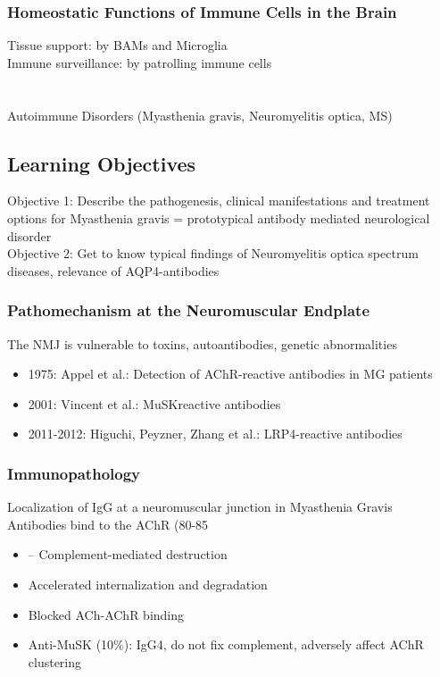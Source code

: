 \begin{itemize}
\begin{itemize}
\subsubsection{Homeostatic Functions of Immune Cells in the Brain}
Tissue support: by BAMs and Microglia
\\Immune surveillance: by patrolling immune cells

\section{}{Autoimmune Disorders (Myasthenia gravis, Neuromyelitis optica, MS)}

\subsection{Learning Objectives}
Objective 1: Describe the pathogenesis, clinical manifestations
and treatment options for Myasthenia gravis
 = prototypical antibody mediated neurological disorder
\\ Objective 2: Get to know typical findings of Neuromyelitis optica
spectrum diseases, relevance of AQP4-antibodies

\subsubsection{Pathomechanism at the Neuromuscular Endplate}
The NMJ is vulnerable to toxins, autoantibodies, genetic abnormalities
\begin{itemize}
    \item 1975: Appel et al.: Detection of
AChR-reactive antibodies in
MG patients
\item 2001: Vincent et al.: MuSKreactive
antibodies
\item 2011-2012: Higuchi, Peyzner,
Zhang et al.: LRP4-reactive antibodies
\end{itemize}

\subsubsection{Immunopathology}
Localization of IgG at a neuromuscular junction in Myasthenia Gravis
\\Antibodies bind to the AChR (80-85%
\begin{itemize}
    \item – Complement-mediated destruction
\item Accelerated internalization and degradation
\item Blocked ACh-AChR binding
\item Anti-MuSK (10$\%$): IgG4, do not fix complement, adversely affect AChR clustering
\end{itemize}


\end{itemize}
\end{itemize}
